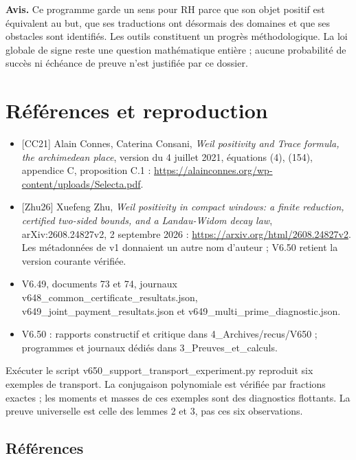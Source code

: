 \documentclass[
  10pt,
  a4paper,
]{article}
\providecommand{\tightlist}{%
  \setlength{\itemsep}{0pt}\setlength{\parskip}{0pt}}
\begin{document}
\textbf{Avis.} Ce programme garde un sens pour RH parce que son objet
positif est équivalent au but, que ses traductions ont désormais des
domaines et que ses obstacles sont identifiés. Les outils constituent un
progrès méthodologique. La loi globale de signe reste une question
mathématique entière ; aucune probabilité de succès ni échéance de
preuve n'est justifiée par ce dossier.

\hypertarget{ruxe9fuxe9rences-et-reproduction}{%
\section{Références et
reproduction}\label{ruxe9fuxe9rences-et-reproduction}}

\begin{itemize}
\tightlist
\item
  {[}CC21{]} Alain Connes, Caterina Consani, \emph{Weil positivity and
  Trace formula, the archimedean place}, version du 4 juillet 2021,
  équations (4), (154), appendice C, proposition C.1 :
  \url{https://alainconnes.org/wp-content/uploads/Selecta.pdf}.
\item
  {[}Zhu26{]} Xuefeng Zhu, \emph{Weil positivity in compact windows: a
  finite reduction, certified two-sided bounds, and a Landau-Widom decay
  law}, arXiv:2608.24827v2, 2 septembre 2026 :
  \url{https://arxiv.org/html/2608.24827v2}. Les métadonnées de v1
  donnaient un autre nom d'auteur ; V6.50 retient la version courante
  vérifiée.
\item
  V6.49, documents 73 et 74, journaux
  v648\_common\_certificate\_resultats.json,
  v649\_joint\_payment\_resultats.json et
  v649\_multi\_prime\_diagnostic.json.
\item
  V6.50 : rapports constructif et critique dans 4\_Archives/recus/V650 ;
  programmes et journaux dédiés dans 3\_Preuves\_et\_calculs.
\end{itemize}

Exécuter le script v650\_support\_transport\_experiment.py reproduit six
exemples de transport. La conjugaison polynomiale est vérifiée par
fractions exactes ; les moments et masses de ces exemples sont des
diagnostics flottants. La preuve universelle est celle des lemmes 2 et
3, pas ces six observations.

\hypertarget{ruxe9fuxe9rences}{%
\subsection{Références}\label{ruxe9fuxe9rences}}
\end{document}
